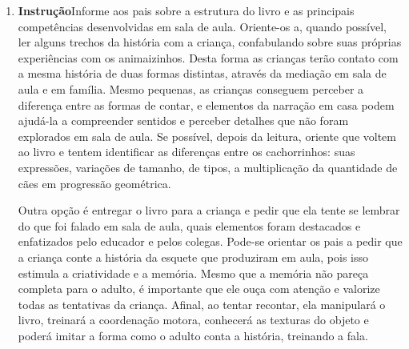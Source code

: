 \documentclass[11pt]{extarticle}
\begin{document}
\begin{enumerate}
\item \textbf{Instrução}\quad Informe aos pais sobre a estrutura do livro e as principais competências desenvolvidas em sala de aula.
Oriente-os a, quando possível, ler alguns trechos da história com a criança, confabulando sobre suas próprias experiências com os animaizinhos.
Desta forma as crianças terão contato com a mesma história de duas formas distintas, através da mediação em sala de aula e em família. 
Mesmo pequenas, as crianças conseguem perceber a diferença entre 
as formas de contar, e elementos da narração em casa podem ajudá-la a compreender 
sentidos e perceber detalhes que não foram explorados em sala de aula. Se possível, depois da leitura, oriente 
que voltem ao livro e tentem identificar as diferenças entre os cachorrinhos: suas expressões, variações de tamanho, de tipos, a multiplicação da quantidade de cães em progressão geométrica.


Outra opção é entregar o livro para a criança e pedir que ela tente se lembrar
do que foi falado em sala de aula, quais elementos foram destacados e enfatizados pelo educador e pelos colegas. Pode-se orientar os pais a pedir que a criança conte a história da esquete que produziram em aula, pois isso estimula a criatividade e a memória. Mesmo que a memória não pareça 
completa para o adulto, é importante que ele ouça com atenção e 
valorize todas as tentativas da criança. Afinal, ao tentar recontar, 
ela manipulará o livro, treinará a coordenação motora, conhecerá as texturas 
do objeto e poderá imitar a forma como o adulto 
conta a história, treinando a fala. 
\end{enumerate}
\end{document}
